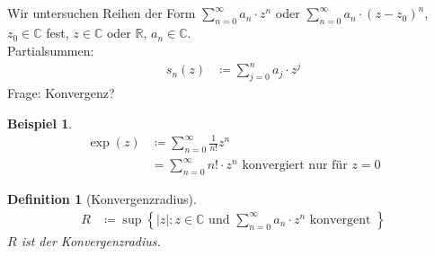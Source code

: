 \documentclass[11pt, twoside, a4paper]{article}
\theoremstyle{plain}
\newtheorem{definition}[blockelement]{Definition}
\newtheorem{beispiel}[blockelement]{Beispiel}
\newcommand{\set}[1]{\left\{#1\right\}}
\newcommand{\pair}[1]{\left(#1\right)}
\newcommand{\abs}[1]{\left|#1\right|}
\newcommand{\definedas}[0]{\coloneqq}
\newcommand{\R}{\mathbb{R}}
\newcommand{\C}{\mathbb{C}}
\begin{document}
    \subsection{}
    \thispagestyle{pagenumberonly}
    Wir untersuchen Reihen der Form $ \sum_{n=0}^{\infty} a_n\cdot z^n$ oder $ \sum_{n=0}^{\infty} a_n \cdot \pair{z-z_0}^n$, $z_0\in\C$ fest, $z\in\C$ oder $\R$, $a_n\in\C$.\\
    Partialsummen:
    \begin{align*}
        s_n(z) &\definedas \sum_{j=0}^{n} a_j\cdot z^j
    \end{align*}
    Frage: Konvergenz?
    \begin{beispiel}
        \begin{align*}
            \exp(z) &\definedas \sum_{n=0}^{\infty} \frac{1}{n!} z^n\\
            &= \sum_{n=0}^{\infty} n! \cdot z^n \text{ konvergiert nur für } z=0
        \end{align*}
    \end{beispiel}

    \begin{definition}[Konvergenzradius]
        \begin{align*}
            R &\definedas \sup \set{\abs{z}: z\in\C \text{ und } \sum_{n=0}^{\infty} a_n \cdot z^n \text{ konvergent } }
        \end{align*}
        $R$ ist der Konvergenzradius.
    \end{definition}
\end{document}
